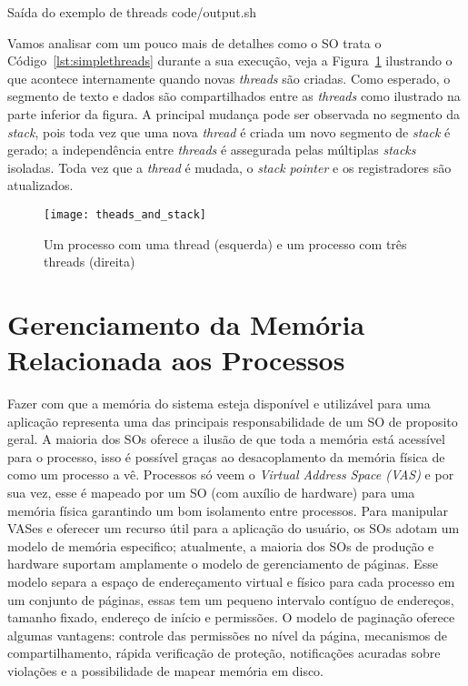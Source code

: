 \begin{ruledcaption}{Saída do exemplo de threads\label{lst:simpleThreadOutput}}
 {code/output.sh}
\end{ruledcaption}

Vamos analisar com um pouco mais de detalhes como o SO trata o
Código~\ref{lst:simplethreads} durante a sua execução, veja a
Figura~\ref{fig:stack_threads} ilustrando o que acontece internamente quando
novas \emph{threads} são criadas. Como esperado, o segmento de texto e dados
são compartilhados entre as \emph{threads} como ilustrado na parte inferior da
figura. A principal mudança pode ser observada no segmento da \emph{stack},
pois toda vez que uma nova \emph{thread} é criada um novo segmento de
\emph{stack} é gerado; a independência entre \emph{threads} é assegurada pelas
múltiplas \emph{stacks} isoladas. Toda vez que a \emph{thread} é mudada, o
\emph{stack pointer} e os registradores são atualizados.

\begin{figure}[!h]
  \centering
  \texttt{[image: theads\_and\_stack]} 
  \caption{Um processo com uma thread (esquerda) e um processo com três threads (direita)}
  \label{fig:stack_threads} 
\end{figure}

\section{Gerenciamento da Memória Relacionada aos Processos}

Fazer com que a memória do sistema esteja disponível e utilizável para uma
aplicação representa uma das principais responsabilidade de um SO de proposito
geral. A maioria dos SOs oferece a ilusão de que toda a memória está acessível
para o processo, isso é possível graças ao desacoplamento da memória física de
como um processo a vê. Processos só veem o \emph{Virtual Address Space (VAS)} e
por sua vez, esse é mapeado por um SO (com auxílio de hardware) para uma
memória física garantindo um bom isolamento entre processos. Para manipular
VASes e oferecer um recurso útil para a aplicação do usuário, os SOs adotam um
modelo de memória especifico; atualmente, a maioria dos SOs de produção e
hardware suportam amplamente o modelo de gerenciamento de páginas.  Esse modelo
separa a espaço de endereçamento virtual e físico para cada processo em um
conjunto de páginas, essas tem um pequeno intervalo contíguo de endereços,
tamanho fixado, endereço de início e permissões. O modelo de paginação oferece
algumas vantagens: controle das permissões no nível da página, mecanismos de
compartilhamento, rápida verificação de proteção, notificações acuradas sobre
violações e a possibilidade de mapear memória em disco.

